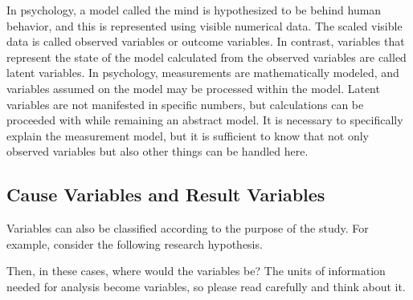 \documentclass{ltjsbook}
\begin{document}


In psychology, a model called the mind is hypothesized to be behind human behavior, and this is represented using visible numerical data. The scaled visible data is called observed variables or outcome variables. In contrast, variables that represent the state of the model calculated from the observed variables are called latent variables. In psychology, measurements are mathematically modeled, and variables assumed on the model may be processed within the model. Latent variables are not manifested in specific numbers, but calculations can be proceeded with while remaining an abstract model. It is necessary to specifically explain the measurement model, but it is sufficient to know that not only observed variables but also other things can be handled here.

\subsection{Cause Variables and Result Variables}
Variables can also be classified according to the purpose of the study. For example, consider the following research hypothesis.

Then, in these cases, where would the variables be? The units of information needed for analysis become variables, so please read carefully and think about it.
\end{document}
